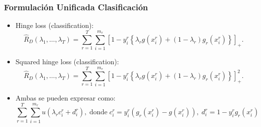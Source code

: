 \documentclass{beamer}
\newcommand{\pospart}[1]{\left[#1\right]_{+}}
\newcommand{\ntasks}{T}
\newcommand{\npertask}{m}
\newcommand{\sample}{D}
\newcommand{\risk}{R}
\newcommand{\emprisk}{\hat{\risk}_{\sample}}
\begin{document}
\begin{frame}
      \frametitle{Formulación Unificada Clasificación}

      \begin{itemize}
            \item Hinge loss (classification):
            \begin{equation}
                \nonumber%
                \emprisk(\lambda_1, \ldots, \lambda_\ntasks) = \sum_{r=1}^\ntasks \sum_{i=1}^{\npertask_r} \pospart{1 - y_i^r \left\lbrace\lambda_r g(x_i^r) + (1 - \lambda_r) g_r(x_i^r) \right \rbrace} .
            \end{equation}
            \item Squared hinge loss (classification):
            \begin{equation}
                \nonumber%
                \emprisk(\lambda_1, \ldots, \lambda_\ntasks) = \sum_{r=1}^\ntasks \sum_{i=1}^{\npertask_r} \pospart{1 - y_i^r \left\lbrace\lambda_r g(x_i^r) + (1 - \lambda_r) g_r(x_i^r) \right \rbrace}^2 .
            \end{equation}
            \item Ambas se pueden expresar como:
            \begin{equation}
                  \nonumber
                  \sum_{r=1}^\ntasks \sum_{i=1}^{\npertask_r} u(\lambda_r c_i^r + d_i^r) , \; \text{donde} \; c_i^r =  y_i^r (g_r(x_i^r) - g(x_i^r))  , \;  d_i^r =  1 - y_i^r g_r(x_i^r)
              \end{equation}
        \end{itemize}

\end{frame}
\end{document}
